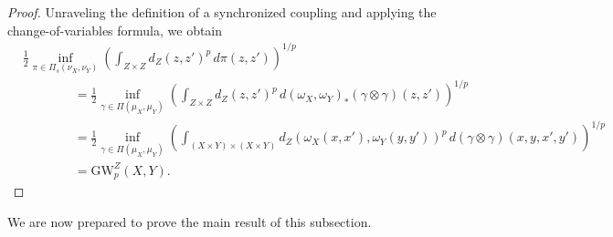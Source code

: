 \documentclass{article}
\theoremstyle{definition}
\newcommand{\dgwz}{\mathrm{GW}_p^Z}
\begin{document}
\begin{proof}
    Unraveling the definition of a synchronized coupling and applying the change-of-variables formula, we obtain
    \begin{align}
    &\frac{1}{2}\inf_{\pi \in \Pi_{s}(\nu_X, \nu_Y)}
    \left(\int_{Z \times Z} d_Z(z, z')^p \, d\pi(z, z')\right)^{1/p}
    \\
    &\qquad \qquad = \frac{1}{2}\inf_{\gamma \in \Pi(\mu_X, \mu_Y)}
    \left(\int_{Z \times Z} d_Z(z, z')^p \, d (\omega_X,\omega_Y)_\ast (\gamma \otimes \gamma)(z, z')\right)^{1/p} \\
    &\qquad \qquad  = \frac{1}{2}\inf_{\gamma \in \Pi(\mu_X, \mu_Y)}
    \left(\int_{(X\times Y)\times (X\times Y)}
        d_Z(\omega_X(x, x'), \omega_Y(y, y'))^p
        \, d(\gamma \otimes \gamma)(x, y, x', y')\right)^{1/p} \\
    &\qquad \qquad = \dgwz(X,Y).
    \end{align}
\end{proof}




We are now prepared to prove the main result of this subsection.
\end{document}
